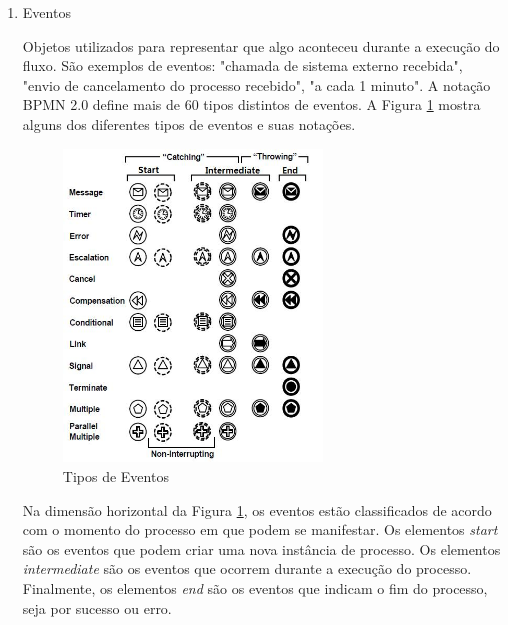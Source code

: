 \begin{enumerate}
    \item Eventos
    
    Objetos utilizados para representar que algo aconteceu durante a execução do fluxo. São exemplos de eventos: "chamada de sistema externo recebida", "envio de cancelamento do processo recebido", "a cada 1 minuto". A notação BPMN 2.0 define mais de 60 tipos distintos de eventos. A Figura \ref{fig:bpmn_events} mostra alguns dos diferentes tipos de eventos e suas notações.
    
    \begin{figure}[H]
    \centering
    \includegraphics[width=0.65\textwidth]{imagens/bpmn_events.jpg}
    \caption{Tipos de Eventos\cite{tipos_eventos}}
    \label{fig:bpmn_events}
    \end{figure}
    
    Na dimensão horizontal da Figura \ref{fig:bpmn_events}, os eventos estão classificados de acordo com o momento do processo em que podem se manifestar. Os elementos \textit{start} são os eventos que podem criar uma nova instância de processo. Os elementos \textit{intermediate} são os eventos que ocorrem durante a execução do processo. Finalmente, os elementos \textit{end} são os  eventos que indicam o fim do processo, seja por sucesso ou erro.
    

\end{enumerate}
